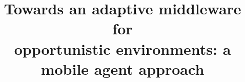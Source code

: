 \documentclass{sig-alternate}
\begin{document}
\title{Towards an adaptive middleware for\\ opportunistic environments: a mobile agent approach}

%
%
%
%
\end{document}
